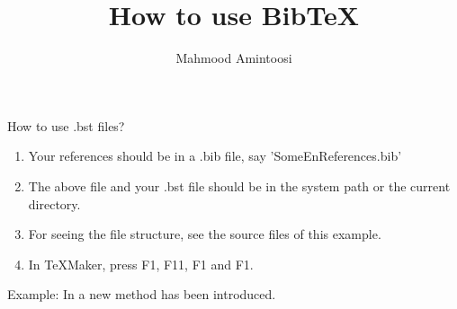 \documentclass[10pt,a4paper]{article}
\title{How to use Bib\TeX}
\author{Mahmood Amintoosi}\date{}
\begin{document}
\maketitle

How to use .bst files?
\begin{enumerate}
\item Your references should be in a .bib file, say 'SomeEnReferences.bib'
\item The above file and your .bst file should be in the system path or the current directory.
\item For seeing the file structure, see the source files of this example.
\item In TeXMaker, press F1, F11, F1 and F1.
\end{enumerate}

Example:
In \citet{Amintoosi09regional} a new method has been introduced.
\nocite{*}


\end{document}
